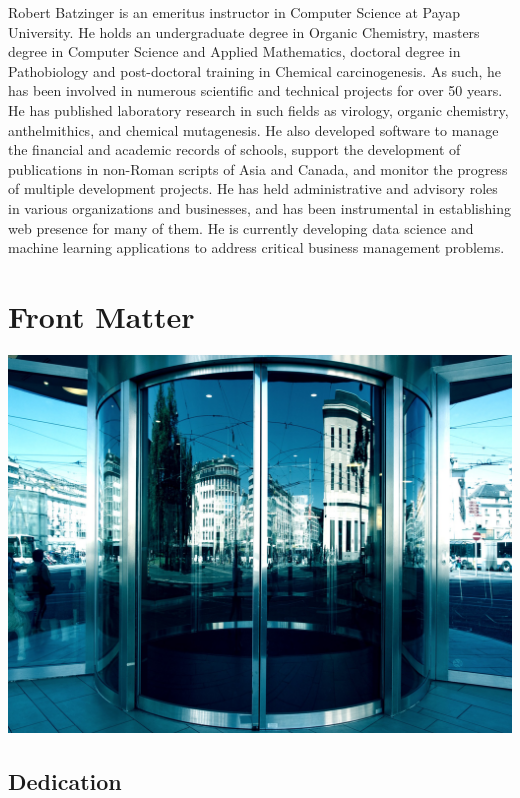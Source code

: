 \documentclass[]{book}
\begin{document}
Robert Batzinger is an emeritus instructor in Computer Science at Payap University. He holds an undergraduate degree in Organic Chemistry, masters degree in Computer Science and Applied Mathematics, doctoral degree in Pathobiology and post-doctoral training in Chemical carcinogenesis. As such, he has been involved in numerous scientific and technical projects for over 50 years. He has published laboratory research in such fields as virology, organic chemistry, anthelmithics, and chemical mutagenesis. He also developed software to manage the financial and academic records of schools, support the development of publications in non-Roman scripts of Asia and Canada, and monitor the progress of multiple development projects. He has held administrative and advisory roles in various organizations and businesses, and has been instrumental in establishing web presence for many of them. He is currently developing data science and machine learning applications to address critical business management problems.

\hypertarget{front-matter}{%
\chapter*{Front Matter}\label{front-matter}}

\includegraphics[width=0.9\linewidth]{images/door}

\hypertarget{dedication}{%
\section*{Dedication}\label{dedication}}
\end{document}

